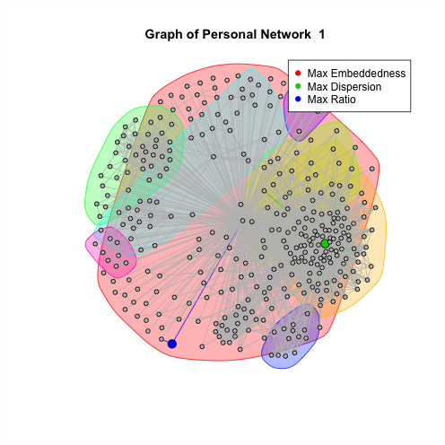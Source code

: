 \documentclass{article}
\begin{document}
\begin{enumerate}
 \includegraphics[scale=0.4]{d14} \\
 

\end{enumerate}
\end{document}
